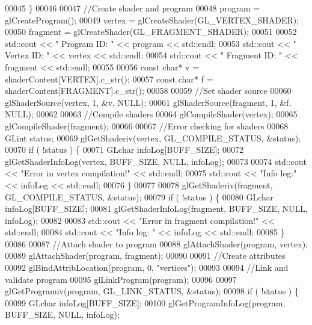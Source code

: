 \begin{DoxyCode}
00045     \}
00046 
00047     \textcolor{comment}{//Create shader and program}
00048     program  = glCreateProgram();
00049     vertex   = glCreateShader(GL\_VERTEX\_SHADER);
00050     fragment = glCreateShader(GL\_FRAGMENT\_SHADER);
00051 
00052     std::cout << \textcolor{stringliteral}{"  Program  ID: "} << program << std::endl;
00053     std::cout << \textcolor{stringliteral}{"  Vertex   ID: "} << vertex << std::endl;
00054     std::cout << \textcolor{stringliteral}{"  Fragment ID: "} << fragment << std::endl;
00055 
00056     \textcolor{keyword}{const} \textcolor{keywordtype}{char}* v = shaderContent[VERTEX].c\_str();
00057     \textcolor{keyword}{const} \textcolor{keywordtype}{char}* f = shaderContent[FRAGMENT].c\_str();
00058 
00059     \textcolor{comment}{//Set shader source}
00060     glShaderSource(vertex,   1, &v, NULL);
00061     glShaderSource(fragment, 1, &f, NULL);
00062 
00063     \textcolor{comment}{//Compile shaders}
00064     glCompileShader(vertex);
00065     glCompileShader(fragment);
00066 
00067     \textcolor{comment}{//Error checking for shaders}
00068     GLint status;
00069     glGetShaderiv(vertex, GL\_COMPILE\_STATUS, &status);
00070     \textcolor{keywordflow}{if} ( !status ) \{
00071         GLchar infoLog[BUFF\_SIZE];
00072         glGetShaderInfoLog(vertex, BUFF\_SIZE, NULL, infoLog);
00073 
00074         std::cout << \textcolor{stringliteral}{"Error in vertex compilation!"} << std::endl;
00075         std::cout << \textcolor{stringliteral}{"Info log:"} << infoLog << std::endl;
00076     \}
00077 
00078     glGetShaderiv(fragment, GL\_COMPILE\_STATUS, &status);
00079     \textcolor{keywordflow}{if} ( !status ) \{
00080         GLchar infoLog[BUFF\_SIZE];
00081         glGetShaderInfoLog(fragment, BUFF\_SIZE, NULL, infoLog);
00082 
00083         std::cout << \textcolor{stringliteral}{"Error in fragment compilation!"} << std::endl;
00084         std::cout << \textcolor{stringliteral}{"Info log: "} << infoLog << std::endl;
00085     \}
00086     
00087     \textcolor{comment}{//Attach shader to program}
00088     glAttachShader(program, vertex);
00089     glAttachShader(program, fragment);
00090 
00091     \textcolor{comment}{//Create attributes}
00092     glBindAttribLocation(program, 0, \textcolor{stringliteral}{"vertices"});
00093 
00094     \textcolor{comment}{//Link and validate program}
00095     glLinkProgram(program);
00096 
00097     glGetProgramiv(program, GL\_LINK\_STATUS, &status);
00098     \textcolor{keywordflow}{if} ( !status ) \{
00099         GLchar infoLog[BUFF\_SIZE];
00100         glGetProgramInfoLog(program, BUFF\_SIZE, NULL, infoLog);

\end{DoxyCode}
